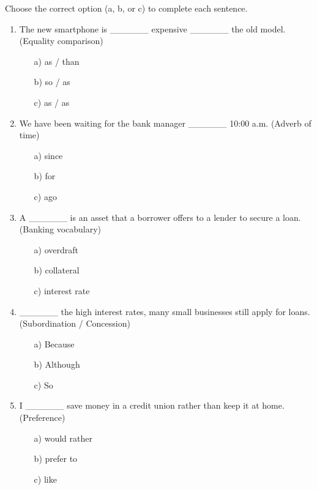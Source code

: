 \documentclass[11pt]{article}
\begin{document}
\begin{exercice}
Choose the correct option (a, b, or c) to complete each sentence.

\begin{enumerate}
    \item The new smartphone is \_\_\_\_\_\_ expensive \_\_\_\_\_\_ the old model. (Equality comparison)
    \begin{itemize}
        \item[a)] as / than
        \item[b)] so / as
        \item[c)] as / as
    \end{itemize}

    \item We have been waiting for the bank manager \_\_\_\_\_\_ 10:00 a.m. (Adverb of time)
    \begin{itemize}
        \item[a)] since
        \item[b)] for
        \item[c)] ago
    \end{itemize}

    \item A \_\_\_\_\_\_ is an asset that a borrower offers to a lender to secure a loan. (Banking vocabulary)
    \begin{itemize}
        \item[a)] overdraft
        \item[b)] collateral
        \item[c)] interest rate
    \end{itemize}

    \item \_\_\_\_\_\_ the high interest rates, many small businesses still apply for loans. (Subordination / Concession)
    \begin{itemize}
        \item[a)] Because
        \item[b)] Although
        \item[c)] So
    \end{itemize}

    \item I \_\_\_\_\_\_ save money in a credit union rather than keep it at home. (Preference)
    \begin{itemize}
        \item[a)] would rather
        \item[b)] prefer to
        \item[c)] like
    \end{itemize}
\end{enumerate}
\end{exercice}
\end{document}
